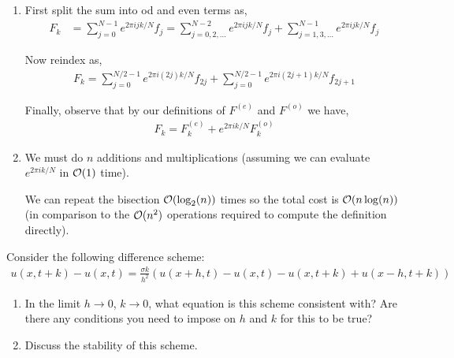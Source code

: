 \documentclass[10pt]{article}
\begin{document}
\begin{solution}[Solution]
    \begin{enumerate}[label=(\alph*)]
    \item
        First split the sum into od and even terms as,
            \begin{align*}
                F_k &= \sum_{j=0}^{N-1}e^{2\pi i j k/N} f_j 
                = \sum_{j=0,2,\ldots}^{N-2} e^{2\pi i j k/N} f_j + \sum_{j=1,3,\ldots}^{N-1} e^{2\pi i j k/N} f_j
            \end{align*}
            
        Now reindex as,
            \begin{align*}
                F_k = \sum_{j=0}^{N/2-1} e^{2\pi i (2j) k / N} f_{2j} + \sum_{j=0}^{N/2-1} e^{2\pi i (2j+1)k/N} f_{2j+1}
            \end{align*}

            Finally, observe that by our definitions of \( F^{(e)} \) and \( F^{(o)} \) we have,
        \begin{align*}
            F_k= F_k^{(e)} + e^{2\pi i k/N} F_k^{(o)}
       \end{align*}
            
    \item 
        We must do \( n \) additions and multiplications (assuming we can evaluate \( e^{2\pi ik/N} \) in \( \mathcal{O}(1) \) time). 

            We can repeat the bisection \( \mathcal{O}(\log_2(n)) \) times so the total cost is \( \mathcal{O}(n\log(n)) \) (in comparison to the \( \mathcal{O}(n^2) \) operations required to compute the definition directly).


\end{enumerate}    
\end{solution}


\begin{problem}
Consider the following difference scheme:
\begin{align*}
    u(x,t+k)- u(x,t) = \frac{\sigma k}{h^2} (u(x+h,t)-u(x,t)-u(x,t+k)+u(x-h,t+k))
\end{align*}
\begin{enumerate}[nolistsep,label=(\alph*)]
    \item In the limit \( h\to0 \), \( k\to 0 \), what equation is this scheme consistent with? Are there any conditions you need to impose on \( h \) and \( k \) for this to be true?
    \item Discuss the stability of this scheme.
\end{enumerate}
\end{problem}
\end{document}
